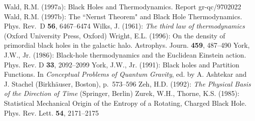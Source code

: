 \documentclass[12pt]{article}
\begin{document}
\begin{thebibliography}{999}
%
\bibitem{}{}{}
Wald, R.M. (1997a): Black Holes and Thermodynamics. Report
gr-qc/9702022
%
\bibitem{}{}{}
Wald, R.M. (1997b): The ``Nernst Theorem" and Black Hole
Thermodynamics. Phys. Rev.~D {\bf 56}, 6467--6474
%
\bibitem{}{}{}
Wilks, J. (1961):
{\it The third law of thermodynamics}
(Oxford University Press, Oxford)
%
\bibitem{}{}{}
Wright, E.L. (1996): On the density of primordial black holes
in the galactic halo. Astrophys. Journ. {\bf 459}, 487--490
%
\bibitem{}{}{}
York, J.W., Jr. (1986): Black-hole thermodynamics and the
Euclidean Einstein action. Phys. Rev. D {\bf 33}, 2092--2099
%
\bibitem{}{}{}
York, J.W., Jr. (1991): Black holes and Partition Functions.
In {\it Conceptual Problems of Quantum Gravity}, ed. by A. Ashtekar
and J. Stachel (Birkh\"auser, Boston), p.~573--596
%
\bibitem{}{}{}
Zeh, H.D. (1992): {\it The Physical Basis of the Direction of Time}
(Springer, Berlin)
%
\bibitem{}{}{}
Zurek, W.H., Thorne, K.S. (1985): Statistical Mechanical Origin
of the Entropy of a Rotating, Charged Black Hole.
Phys. Rev. Lett. {\bf 54}, 2171--2175
%

\end{thebibliography}
\end{document}
